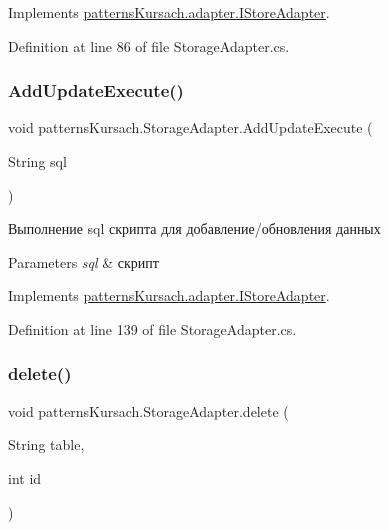 Implements \mbox{\hyperlink{interfacepatterns_kursach_1_1adapter_1_1_i_store_adapter_a12816166876b9ddffa991a55d5e917c8}{patterns\+Kursach.\+adapter.\+I\+Store\+Adapter}}.



Definition at line 86 of file Storage\+Adapter.\+cs.

\mbox{\label{classpatterns_kursach_1_1_storage_adapter_a45d79830f42e8ba2341425175559b31b}} 
\subsubsection{\texorpdfstring{Add\+Update\+Execute()}{AddUpdateExecute()}}
{\footnotesize\ttfamily void patterns\+Kursach.\+Storage\+Adapter.\+Add\+Update\+Execute (\begin{DoxyParamCaption}\item[{String}]{sql }\end{DoxyParamCaption})}



Выполнение sql скрипта для добавление/обновления данных 


\begin{DoxyParams}{Parameters}
{\em sql} & скрипт\\
\hline
\end{DoxyParams}


Implements \mbox{\hyperlink{interfacepatterns_kursach_1_1adapter_1_1_i_store_adapter_ad1833d2efd297547ff34828468e914d2}{patterns\+Kursach.\+adapter.\+I\+Store\+Adapter}}.



Definition at line 139 of file Storage\+Adapter.\+cs.

\mbox{\label{classpatterns_kursach_1_1_storage_adapter_a6c87c580a8bdc3e2803ae31e59ad0071}} 
\subsubsection{\texorpdfstring{delete()}{delete()}}
{\footnotesize\ttfamily void patterns\+Kursach.\+Storage\+Adapter.\+delete (\begin{DoxyParamCaption}\item[{String}]{table,  }\item[{int}]{id }\end{DoxyParamCaption})}



